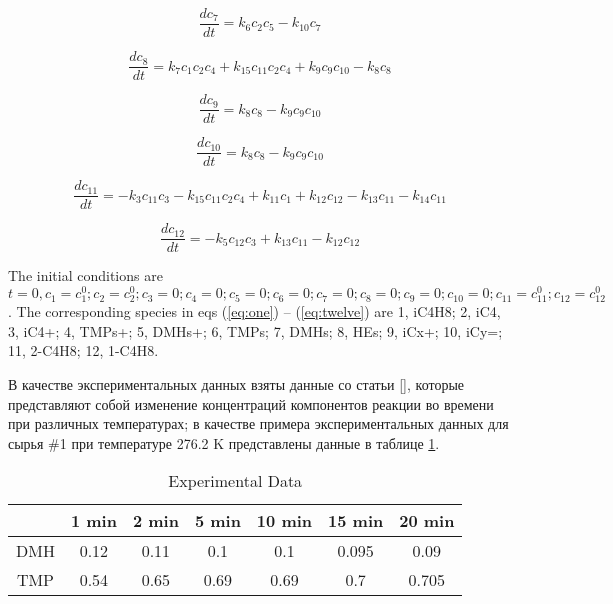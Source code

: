 \documentclass{svproc}
\begin{document}
\begin{equation}
  \frac{dc_7}{dt} = k_6c_{2}c_5 - k_{10}c_7
  \label{eq:seven}
\end{equation}

\begin{equation}
  \frac{dc_8}{dt} = k_7c_{1}c_2c_4 + k_{15}c_{11}c_2c_4 + k_9c_9c_{10} - k_8c_8
  \label{eq:eight}
\end{equation}

\begin{equation}
  \frac{dc_9}{dt} = k_8c_{8} - k_{9}c_{9}c_{10}
  \label{eq:nine}
\end{equation}

\begin{equation}
  \frac{dc_{10}}{dt} = k_8c_{8} - k_{9}c_{9}c_{10}
  \label{eq:ten}
\end{equation}

\begin{equation}
  \frac{dc_{11}}{dt} = -k_3c_{11}c_3 - k_{15}c_{11}c_{2}c_4 + k_{11}c_1 + k_{12}c_{12} - k_{13}c_{11} - k_{14}c_{11}
  \label{eq:eleven}
\end{equation}

\begin{equation}
  \frac{dc_{12}}{dt} = -k_5c_{12}c_3 + k_{13}c_{11} - k_{12}c_{12}
  \label{eq:twelve}
\end{equation}

The initial conditions are $t = 0, c_1 = c_1^0; c_2=c_2^0; c_3 = 0; c_4 = 0; c_5= 0; c_6 = 0; c_7 = 0; c_8 = 0; c_9 = 0; c_{10} = 0; c_{11}=c_{11}^0; c_{12} = c_{12}^0$.
The corresponding species in eqs (\ref{eq:one}) -- (\ref{eq:twelve}) are 1, iC4H8; 2, iC4, 3, iC4+; 4, TMPs+; 5, DMHs+; 6, TMPs; 7, DMHs; 8, HEs; 9, iCx+; 10, iCy=; 11, 2-C4H8; 12, 1-C4H8.

В качестве экспериментальных данных взяты данные со статьи [], которые представляют собой изменение концентраций компонентов реакции во времени при различных температурах; в качестве примера экспериментальных данных для сырья \#1 при температуре 276.2 K представлены данные в таблице \ref{table1}.

\begin{table}
\label{table1}
\caption{Experimental Data}
\begin{center}
\begin{tabular}{ccccccc}
\hline
& 1 min & 2 min & 5 min & 10 min & 15 min & 20 min  \\
\hline\rule{0pt}{12pt}
DMH & 0.12 & 0.11 & 0.1	& 0.1 &	0.095 &	0.09  \\
TMP & 0.54 & 0.65 & 0.69 & 0.69 & 0.7 & 0.705 \\[2pt]
\hline
\end{tabular}
\end{center}
\end{table}
\end{document}
